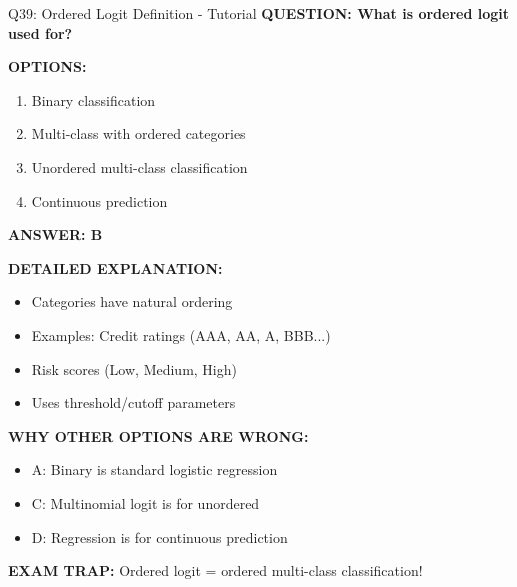 \documentclass[8pt]{beamer}
\begin{document}
	\begin{frame}{Q39: Ordered Logit Definition - Tutorial}
		\fontsize{6.5}{7.5}\selectfont
		\textbf{QUESTION: What is ordered logit used for?}
		
		\vspace{0.1cm}
		\textbf{OPTIONS:}
		\begin{enumerate}
			\item Binary classification
			\item Multi-class with ordered categories
			\item Unordered multi-class classification
			\item Continuous prediction
		\end{enumerate}
		
		\vspace{0.1cm}
		\textcolor{myblue}{\textbf{ANSWER: B}}
		
		\vspace{0.1cm}
		\textbf{DETAILED EXPLANATION:}
		\begin{itemize}
			\item Categories have natural ordering
			\item Examples: Credit ratings (AAA, AA, A, BBB...)
			\item Risk scores (Low, Medium, High)
			\item Uses threshold/cutoff parameters
		\end{itemize}
		
		\vspace{0.1cm}
		\textcolor{myred}{\textbf{WHY OTHER OPTIONS ARE WRONG:}}
		\begin{itemize}
			\item \textcolor{myred}{A:} Binary is standard logistic regression
			\item \textcolor{myred}{C:} Multinomial logit is for unordered
			\item \textcolor{myred}{D:} Regression is for continuous prediction
		\end{itemize}
		
		\textcolor{myred}{\textbf{EXAM TRAP:}} Ordered logit = \textcolor{myblue}{ordered multi-class classification}!
	\end{frame}
	
\end{document}
